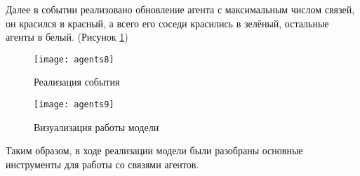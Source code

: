 Далее в событии реализовано обновление агента с максимальным числом связей, он красился в красный, а всего его соседи красились в зелёный, остальные агенты в белый. (Рисунок \ref{fig:agents8})
\begin{figure}[h]
	\centering \texttt{[image: agents8]}
	\caption{Реализация события}
	\label{fig:agents8}
\end{figure}

\newpage

\begin{figure}[h]
	\centering \texttt{[image: agents9]}
	\caption{Визуализация работы модели}
	\label{fig:agents9}
\end{figure}

Таким образом, в ходе реализации модели были разобраны основные инструменты для работы со связями агентов.